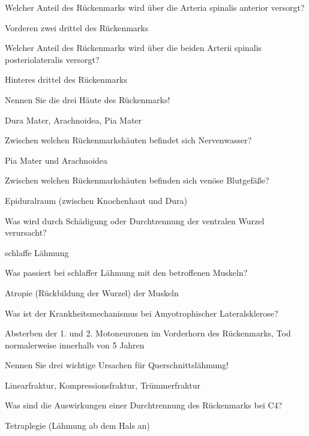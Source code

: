 \documentclass[10pt, a4paper]{exam}
\begin{document}
\begin{questions}
  \question Welcher Anteil des Rückenmarks wird über die Arteria spinalis anterior versorgt?
  \begin{solution}
    Vorderen zwei drittel des Rückenmarks
  \end{solution}

  \question Welcher Anteil des Rückenmarks wird über die beiden Arterii spinalis posteriolateralis versorgt?
  \begin{solution}
    Hinteres drittel des Rückenmarks
  \end{solution}

  \question Nennen Sie die drei Häute des Rückenmarks!
  \begin{solution}
    Dura Mater, Arachnoidea, Pia Mater
  \end{solution}

  \question Zwischen welchen Rückenmarkshäuten befindet sich Nervenwasser?
  \begin{solution}
    Pia Mater und Arachnoidea
  \end{solution}

  \question Zwischen welchen Rückenmarkshäuten befinden sich venöse Blutgefäße?
  \begin{solution}
    Epiduralraum (zwischen Knochenhaut und Dura)
  \end{solution}

  \question Was wird durch Schädigung oder Durchtrennung der ventralen Wurzel verursacht?
  \begin{solution}
    schlaffe Lähmung
  \end{solution}

  \question Was passiert bei schlaffer Lähmung mit den betroffenen Muskeln?
  \begin{solution}
    Atropie (Rückbildung der Wurzel) der Muskeln
  \end{solution}

  \question Was ist der Krankheitsmechanismus bei Amyotrophischer Lateralsklerose?
  \begin{solution}
    Absterben der 1. und 2. Motoneuronen im Vorderhorn des Rückenmarks, Tod normalerweise
    innerhalb von 5 Jahren
  \end{solution}

  \question Nennen Sie drei wichtige Ursachen für Querschnittslähmung!
  \begin{solution}
    Linearfraktur, Kompressionsfraktur, Trümmerfraktur
  \end{solution}

  \question Was sind die Auswirkungen einer Durchtrennung des Rückenmarks bei C4?
  \begin{solution}
    Tetraplegie (Lähmung ab dem Hals an)
  \end{solution}


\end{questions}
\end{document}
